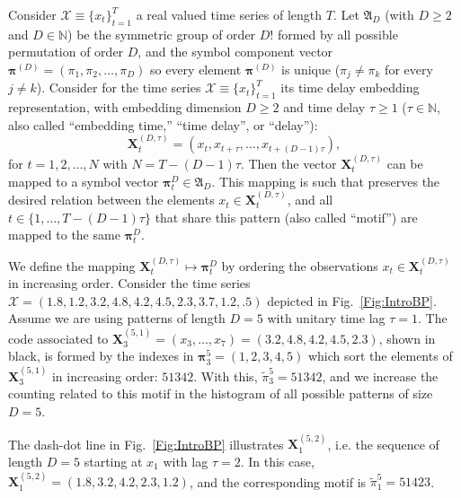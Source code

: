 \documentclass[journal]{IEEEtran}
\renewcommand{\Bbb}{\mathbb}
\begin{document}
Consider ${\mathcal X} \equiv \{x_t\}_{t=1}^{T}$ a real valued time series of length $T$. 
Let ${\mathfrak A}_{D}$ (with $D \geq 2$ and $D \in {\Bbb N}$) be the symmetric group of order $D!$ formed by all 
possible permutation of order $D$, and the symbol component vector 
${\bm \pi}^{(D)} = (\pi_1, \pi_2, \dots, \pi_D)$ so every element ${\bm \pi}^{(D)}$ is unique 
($\pi_j \neq \pi_k$ for every $j \neq k$). 
Consider for the time series ${\mathcal X} \equiv \{x_t\}_{t=1}^{T}$ its time delay embedding representation,
with embedding dimension $D \geq 2$ and time delay $\tau \geq 1$ ($\tau \in {\Bbb N}$, also called ``embedding time,'' ``time delay'', or ``delay''):
\begin{equation} 
\label{eq:time-delay}
{\mathbf X}^{(D,\tau)}_t =( x_t,x_{t+\tau},\dots,x_{t+(D-1)\tau} ) ,
\end{equation} 
for $t = 1,2,\dots,N$ with $N = T-(D-1) \tau$.
Then the vector ${\mathbf X}^{(D,\tau)}_t$ can be mapped to a symbol vector ${\bm \pi}_t^D \in {\mathfrak A}_{D}$. 
This mapping is such that preserves the desired relation between the elements 
$x_t  \in {\mathbf X}^{(D,\tau)}_t$, and all $t \in \{1,\dots,T-(D-1)\tau\}$ that share this pattern (also called ``motif'') are mapped to the same 
${\bm \pi}_t^{D}$.

We define the mapping ${\mathbf X}_t^{(D,\tau)} \mapsto {\mathbf \pi}_t^{D}$ by ordering the observations $x_t \in {\mathbf X}_t^{(D,\tau)}$ in increasing order.
Consider the time series $\mathcal X = (1.8, 1.2, 3.2, 4.8, 4.2, 4.5, 2.3, 3.7, 1.2, .5)$ depicted in Fig.~\ref{Fig:IntroBP}.
Assume we are using patterns of length $D=5$ with unitary time lag $\tau=1$.
The code associated to $\mathbf X_{3}^{(5,1)}=(x_3,\dots,x_7)=(3.2, 4.8, 4.2, 4.5, 2.3)$, shown in black, is formed by the indexes in $\bm\pi_3^{5}=(1,2,3,4,5)$ which sort the elements of $\mathbf X_{3}^{(5,1)}$ in increasing order: $51342$.
With this, $\widetilde{\pi}_3^{5} = 51342$, and we increase the counting related to this motif in the histogram of all possible patterns of size $D=5$.

The dash-dot line in Fig.~\ref{Fig:IntroBP} illustrates $\mathbf X_{1}^{(5,2)}$, i.e. the sequence of length $D=5$ starting at $x_1$ with lag $\tau=2$.
In this case, $\mathbf X_{1}^{(5,2)}= (1.8, 3.2, 4.2, 2.3, 1.2)$, and the corresponding motif is $\widetilde{\pi}_1^{5}=51423$.
\end{document}
